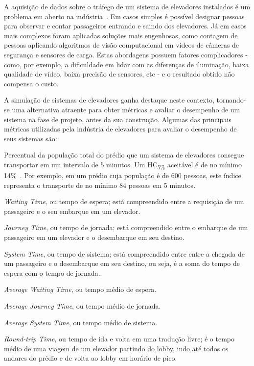 A aquisição de dados sobre o tráfego de um sistema de elevadores instalados é um problema em aberto na indústria~\cite{KOEHLEROTTIGER02}. Em casos simples é possível designar pessoas para observar e contar passageiros entrando e saindo dos elevadores. Já em casos mais complexos foram aplicadas soluções mais engenhosas, como contagem de pessoas aplicando algoritmos de visão computacional em vídeos de câmeras de segurança e sensores de carga. Estas abordagens possuem fatores complicadores - como, por exemplo, a dificuldade em lidar com as diferenças de iluminação, baixa qualidade de vídeo, baixa precisão de sensores, etc - e o resultado obtido não compensa o custo.

A simulação de sistemas de elevadores ganha destaque neste contexto, tornando-se uma alternativa atraente para obter métricas e avaliar o desempenho de um sistema na fase de projeto, antes da sua construção. Algumas das principais métricas utilizadas pela indústria de elevadores para avaliar o desempenho de seus sistemas são:

\begin{description}[leftmargin=!,labelwidth=\widthof{\bfseries HC\textsubscript{5\%}}]
  \item[HC\textsubscript{5\%}]
  Percentual da população total do prédio que um sistema de elevadores consegue transportar em um intervalo de 5 minutos. Um HC\textsubscript{5\%} aceitável é de no mínimo 14\%~\cite{KOEHLEROTTIGER02}. Por exemplo, em um prédio cuja população é de 600 pessoas, este índice representa o transporte de no mínimo 84 pessoas em 5 minutos.

  \item[WT]
  \textit{Waiting Time}, ou tempo de espera; está compreendido entre a requisição de um passageiro e o seu embarque em um elevador.

  \item[JT]
  \textit{Journey Time}, ou tempo de jornada; está compreendido entre o embarque de um passageiro em um elevador e o desembarque em seu destino.

  \item[ST]
  \textit{System Time}, ou tempo de sistema; está compreendido entre entre a chegada de um passageiro e o desembarque em seu destino, ou seja, é a soma do tempo de espera com o tempo de jornada.

  \item[AWT]
  \textit{Average Waiting Time}, ou tempo médio de espera.

  \item[AJT]
  \textit{Average Journey Time}, ou tempo médio de jornada.

  \item[AST]
  \textit{Average System Time}, ou tempo médio de sistema.

  \item[RTT]
  \textit{Round-trip Time}, ou tempo de ida e volta em uma tradução livre; é o tempo médio de uma viagem de um elevador partindo do lobby, indo até todos os andares do prédio e de volta ao lobby em horário de pico.
\end{description}

